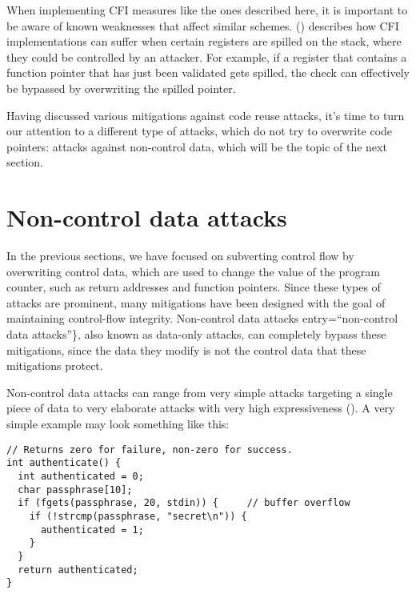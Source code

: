 \documentclass[
  a4paper,
]{report}
\begin{document}
When implementing CFI measures like the ones described here, it is
important to be aware of known weaknesses that affect similar schemes.
() describes how CFI
implementations can suffer when certain registers are spilled on the
stack, where they could be controlled by an attacker. For example, if a
register that contains a function pointer that has just been validated
gets spilled, the check can effectively be bypassed by overwriting the
spilled pointer.

Having discussed various mitigations against code reuse attacks, it's
time to turn our attention to a different type of attacks, which do not
try to overwrite code pointers: attacks against non-control data, which
will be the topic of the next section.

\section{Non-control data attacks}\label{non-control-data-attacks}

In the previous sections, we have focused on subverting control flow by
overwriting \label{__index_entry_59}{control
data}, which are used to change the value of the
program counter, such as return addresses and function pointers. Since
these types of attacks are prominent, many mitigations have been
designed with the goal of maintaining control-flow integrity.
\label{__index_entry_60}{Non-control data
attacks} entry=``non-control data
attacks''\}, also known as
\label{__index_entry_61}{data-only
attacks}, can completely bypass these
mitigations, since the data they modify is not the control data that
these mitigations protect.

Non-control data attacks can range from very simple attacks targeting a
single piece of data to very elaborate attacks with very high
expressiveness (). A very
simple example may look something like this:

\begin{verbatim}
// Returns zero for failure, non-zero for success.
int authenticate() {
  int authenticated = 0;
  char passphrase[10];
  if (fgets(passphrase, 20, stdin)) {     // buffer overflow
    if (!strcmp(passphrase, "secret\n")) {
      authenticated = 1;
    }
  }
  return authenticated;
}
\end{verbatim}
\end{document}
